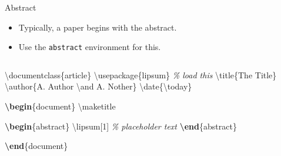 \documentclass[,aspectratio=43]{beamer}
\newenvironment{Shaded}{\begin{snugshade}}{\end{snugshade}}
\newcommand{\BuiltInTok}[1]{#1}
\newcommand{\CommentTok}[1]{\textcolor[rgb]{0.38,0.63,0.69}{\textit{#1}}}
\newcommand{\ExtensionTok}[1]{#1}
\newcommand{\FunctionTok}[1]{\textcolor[rgb]{0.02,0.16,0.49}{#1}}
\newcommand{\KeywordTok}[1]{\textcolor[rgb]{0.00,0.44,0.13}{\textbf{#1}}}
\newcommand{\NormalTok}[1]{#1}
\begin{document}
\begin{frame}[fragile]{Abstract}
\begin{itemize}
\item
  Typically, a paper begins with the abstract.
\item
  Use the \texttt{abstract} environment for this.
\end{itemize}

\begin{columns}[T]
\begin{column}{0.53\textwidth}
\small
\vspace{-1em}

\begin{Shaded}
\begin{Highlighting}[]
\BuiltInTok{\textbackslash{}documentclass}\NormalTok{\{}\ExtensionTok{article}\NormalTok{\}}
\BuiltInTok{\textbackslash{}usepackage}\NormalTok{\{}\ExtensionTok{lipsum}\NormalTok{\}  }\CommentTok{\% load this }
\FunctionTok{\textbackslash{}title}\NormalTok{\{The Title\}}
\FunctionTok{\textbackslash{}author}\NormalTok{\{A. Author }\FunctionTok{\textbackslash{}and}\NormalTok{ A. Nother\}}
\FunctionTok{\textbackslash{}date}\NormalTok{\{}\FunctionTok{\textbackslash{}today}\NormalTok{\}}

\KeywordTok{\textbackslash{}begin}\NormalTok{\{}\ExtensionTok{document}\NormalTok{\} }
\FunctionTok{\textbackslash{}maketitle}

\KeywordTok{\textbackslash{}begin}\NormalTok{\{}\ExtensionTok{abstract}\NormalTok{\}}
\FunctionTok{\textbackslash{}lipsum}\NormalTok{[1]  }\CommentTok{\% placeholder text}
\KeywordTok{\textbackslash{}end}\NormalTok{\{}\ExtensionTok{abstract}\NormalTok{\}}

\KeywordTok{\textbackslash{}end}\NormalTok{\{}\ExtensionTok{document}\NormalTok{\}}
\end{Highlighting}
\end{Shaded}
\end{column}


\end{columns}
\end{frame}
\end{document}
